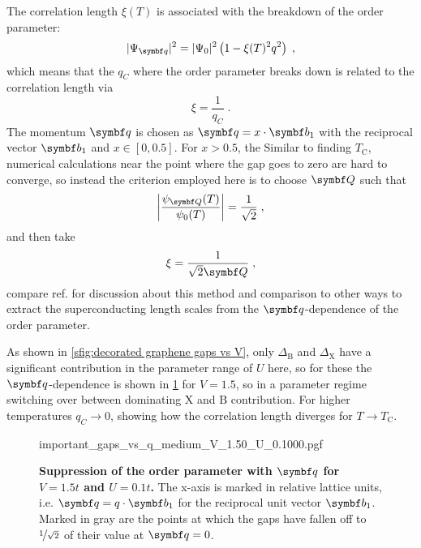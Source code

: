 \documentclass[../notes.tex]{subfiles}
\begin{document}
The correlation length \(\xi (T)\) is associated with the breakdown of the order parameter:
\begin{equation}
	\vert \Psi_{\vb{q}} \vert^2 = \vert \Psi_{0} \vert^2 \left(1 - \xi(T)^2 q^2\right) \;,
\end{equation}
which means that the \(q_C\) where the order parameter breaks down is related to the correlation length via
\begin{equation}
	\xi = \frac{1}{q_C}\;.
\end{equation}
The momentum \(\vb{q}\) is chosen as \(\vb{q} = x \cdot \vb{b}_1\) with the reciprocal vector \(\vb{b}_1\) and \(x \in [0, 0.5]\).
For \(x > 0.5\), the 
Similar to finding \(T_{\mathrm{C}}\), numerical calculations near the point where the gap goes to zero are hard to converge, so instead the criterion employed here is to choose \(\vb{Q}\) such that
\begin{equation}
	\left\vert \frac{\psi_{\vb{Q}}(T)}{\psi_0 (T)} \right\vert = \frac{1}{\sqrt{2}}\;,
\end{equation}
and then take
\begin{equation}
	\xi = \frac{1}{\sqrt{2} \vb{Q}}\;,
\end{equation}
compare ref. \cite{wittBypassingLatticeBCS2024} for discussion about this method and comparison to other ways to extract the superconducting length scales from the \(\vb{q}\)-dependence of the order parameter.

As shown in \cref{sfig:decorated graphene gaps vs V}, only \(\Delta_{\mathrm{B}}\) and \(\Delta_{\mathrm{X}}\) have a significant contribution in the parameter range of \(U\) here, so for these the \(\vb{q}\)-dependence is shown in \cref{fig:decorated graphene relevant gaps vs q for medium V} for \(V = 1.5\), so in a parameter regime switching over between dominating \(\mathrm{X}\) and \(\mathrm{B}\) contribution.
For higher temperatures \(q_C \to 0\), showing how the correlation length diverges for \(T \to T_{\mathrm{C}}\).
\begin{figure}[tb]
	\centering
	{important_gaps_vs_q_medium_V_1.50_U_0.1000.pgf}
	\caption[Suppression of the order parameter with \(\vb{q}\) for \(V = 1.5t\) and \(U = 0.1t\).]{
		\textbf{Suppression of the order parameter with \(\vb{q}\) for \(V = 1.5t\) and \(U = 0.1t\).} The x-axis is marked in relative lattice units, i.e. \(\vb{q} = q \cdot \vb{b}_1\) for the reciprocal unit vector \(\vb{b}_1\). Marked in gray are the points at which the gaps have fallen off to \(\nicefrac{1}{\sqrt{2}}\) of their value at \(\vb{q} = 0\).}
	\label{fig:decorated graphene relevant gaps vs q for medium V}
\end{figure}
\end{document}
